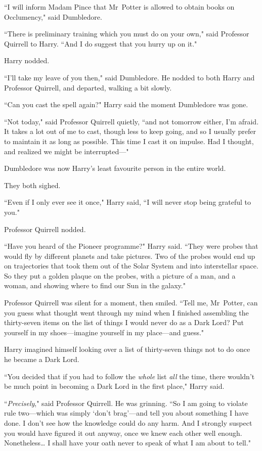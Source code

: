 ``I will inform Madam Pince that Mr~Potter is allowed to obtain books on Occlumency," said Dumbledore.

``There is preliminary training which you must do on your own," said Professor Quirrell to Harry. ``And I do suggest that you hurry up on it."

Harry nodded.

``I'll take my leave of you then," said Dumbledore. He nodded to both Harry and Professor Quirrell, and departed, walking a bit slowly.

``Can you cast the spell again?" Harry said the moment Dumbledore was gone.

``Not today," said Professor Quirrell quietly, ``and not tomorrow either, I'm afraid. It takes a lot out of me to cast, though less to keep going, and so I usually prefer to maintain it as long as possible. This time I cast it on impulse. Had I thought, and realized we might be interrupted—"

Dumbledore was now Harry's least favourite person in the entire world.

They both sighed.

``Even if I only ever see it once," Harry said, ``I will never stop being grateful to you."

Professor Quirrell nodded.

``Have you heard of the Pioneer programme?" Harry said. ``They were probes that would fly by different planets and take pictures. Two of the probes would end up on trajectories that took them out of the Solar System and into interstellar space. So they put a golden plaque on the probes, with a picture of a man, and a woman, and showing where to find our Sun in the galaxy."

Professor Quirrell was silent for a moment, then smiled. ``Tell me, Mr~Potter, can you guess what thought went through my mind when I finished assembling the thirty-seven items on the list of things I would never do as a Dark Lord? Put yourself in my shoes—imagine yourself in my place—and guess."

Harry imagined himself looking over a list of thirty-seven things not to do once he became a Dark Lord.

``You decided that if you had to follow the \emph{whole} list \emph{all} the time, there wouldn't be much point in becoming a Dark Lord in the first place," Harry said.

``\emph{Precisely}," said Professor Quirrell. He was grinning. ``So I am going to violate rule two—which was simply `don't brag'—and tell you about something I have done. I don't see how the knowledge could do any harm. And I strongly suspect you would have figured it out anyway, once we knew each other well enough. Nonetheless{\ldots} I shall have your oath never to speak of what I am about to tell."

